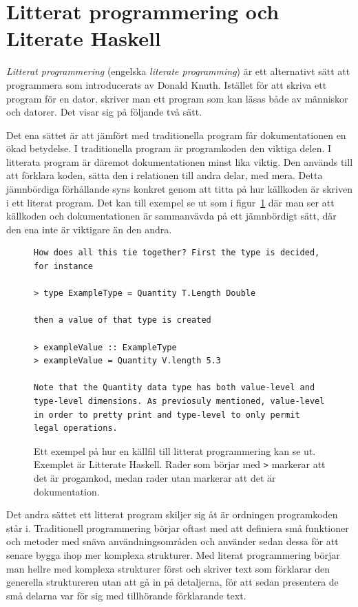 \section{Litterat programmering och Literate Haskell}\label{sec:lhs}
\begin{draft}
\textit{Litterat programmering} (engelska \textit{literate programming}) är ett
alternativt sätt att programmera som introducerats av Donald Knuth\cite{knuth}.
Istället för att skriva ett program för en dator, skriver man ett program som
kan läsas både av människor och datorer. Det visar sig på följande två sätt.

Det ena sättet är att jämfört med traditionella program får dokumentationen en
ökad betydelse. I traditionella program är programkoden den viktiga delen. I
litterata program är däremot dokumentationen minst lika viktig. Den används till
att förklara koden, sätta den i relationen till andra delar, med mera.
Detta jämnbördiga förhållande syns konkret genom att titta på hur källkoden är
skriven i ett literat program. Det kan till exempel se ut som i
figur~\ref{fig:litterate_haskell_exempel} där man ser att källkoden och
dokumentationen är sammanvävda på ett jämnbördigt sätt, där den ena inte är
viktigare än den andra.

\begin{figure}[tph]
  \begin{lstlisting}[language={}]
How does all this tie together? First the type is decided, for instance

> type ExampleType = Quantity T.Length Double

then a value of that type is created

> exampleValue :: ExampleType
> exampleValue = Quantity V.length 5.3

Note that the Quantity data type has both value-level and type-level dimensions. As previosuly mentioned, value-level in order to pretty print and type-level to only permit legal operations.
\end{lstlisting}
  \caption{Ett exempel på hur en källfil till litterat programmering kan se ut.
           Exemplet är Litterate Haskell. Rader som börjar med \texttt{>}
           markerar att det är progamkod, medan rader utan markerar att det är
           dokumentation.}\label{fig:litterate_haskell_exempel} 
\end{figure}

Det andra sättet ett litterat program skiljer sig åt är ordningen programkoden
står i. Traditionell programmering börjar oftast med att definiera små funktioner
och metoder med snäva användningsområden och använder sedan dessa för att senare
bygga ihop mer komplexa strukturer. Med literat programmering börjar man hellre
med komplexa strukturer först och skriver text som förklarar den generella
struktureren utan att gå in på detaljerna, för att sedan presentera de små
delarna var för sig med tillhörande förklarande text.


\end{draft}
